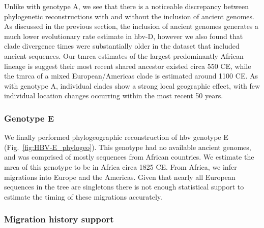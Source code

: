Unlike with genotype A, we see that there is a noticeable discrepancy between phylogenetic reconstructions with and without the inclusion of ancient genomes.
As discussed in the previous section, the inclusion of ancient genomes generates a much lower evolutionary rate estimate in \gls{hbv}-D, however we also found that clade divergence times were substantially older in the dataset that included ancient sequences.
Our \gls{tmrca} estimates of the largest predominantly African lineage is suggest their most recent shared ancestor existed circa 550 CE, while the \gls{tmrca} of a mixed European/Americas clade is estimated around 1100 CE.
As with genotype A, individual clades show a strong local geographic effect, with few individual location changes occurring within the most recent 50 years.

\subsubsection{Genotype E}

We finally performed phylogeographic reconstruction of \gls{hbv} genotype E (Fig.~\ref{fig:HBV-E_phylogeo}).
This genotype had no available ancient genomes, and was comprised of mostly sequences from African countries.
We estimate the \gls{mrca} of this genotype to be in Africa circa 1825 CE.
From Africa, we infer migrations into Europe and the Americas.
Given that nearly all European sequences in the tree are singletons there is not enough statistical support to estimate the timing of these migrations accurately.

\subsubsection{Migration history support}

